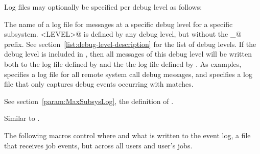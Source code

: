Log files may optionally be specified per debug level as follows:
\begin{description}

\label{param:SubsysLevelLog}
\item[\MacroB{<SUBSYS>\_<LEVEL>\_LOG}]
  The name of a log file for messages at a specific debug level for a
  specific subsystem.  
  \verb@<LEVEL>@ is defined by any debug level,
  but without the \verb@D_@ prefix.
  See section~\ref{list:debug-level-description} for the list of debug levels.
  If the debug level is included in
  , then all messages of this debug level will be
  written both to the log file defined by  and the
  the log file defined by .  As examples,
   specifies a log file for all remote
  system call debug messages,
  and  specifies a log file that only captures
   debug events occurring with matches.

\label{param:MaxSubsysLevelLog}
\item[\Macro{MAX\_<SUBSYS>\_<LEVEL>\_LOG}]
  See section~\ref{param:MaxSubsysLog}, the definition of
  .

\label{param:TruncSubsysLevelLogOnOpen}
\item[\Macro{TRUNC\_<SUBSYS>\_<LEVEL>\_LOG\_ON\_OPEN}]
  Similar to .

\end{description}

The following macros control where and what is written to the 
event log,
a file that receives job events, 
but across all users and user's jobs.

